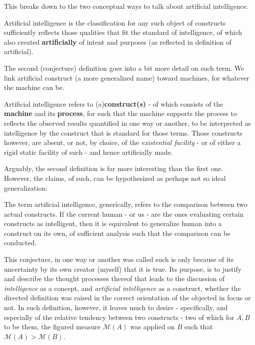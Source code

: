 This breaks down to the two conceptual ways to talk about artificial intelligence.
\begin{conjecture}
    Artificial intelligence is the classification for any such object of constructs sufficiently reflects those qualities that fit the standard of intelligence, of which also created \textbf{artificially} of intent and purposes (as reflected in definition of artificial).
\end{conjecture}

The second (conjecture) definition goes into a bit more detail on such term. We link artificial construct (a more generalized name) toward machines, for whatever the machine can be. 

\begin{conjecture}
    Artificial intelligence refers to (a)\textbf{construct(s)} - of which consists of the \textbf{machine} and its \textbf{process}, for such that the machine supports the process to reflects the observed results quantified in one way or another, to be interpreted as intelligence by the construct that is standard for those terms. Those constructs however, are absent, or not, by choice, of the \textit{existential facility} - or of either a rigid static facility of such - and hence artificially made.
\end{conjecture}

Arguably, the second definition is far more interesting than the first one. However, the claims, of such, can be hypothesized as perhaps not so ideal generalization:

\begin{hypothesis}
    The term artificial intelligence, generically, refers to the comparison between two actual constructs. If the current human - or us - are the ones evaluating certain constructs as intelligent, then it is equivalent to generalize human into a construct on its own, of sufficient analysis such that the comparison can be conducted.
\end{hypothesis}

This conjecture, in one way or another was called such is only because of its uncertainty by its own creator (myself) that it is true. Its purpose, is to justify and describe the thought processes thereof that leads to the discussion of \textit{intelligence} as a concept, and \textit{artificial intelligence} as a construct, whether the directed definition was raised in the correct orientation of the objected in focus or not. In such definition, however, it leaves much to desire - specifically, and especially of the relative tendency between two constructs - two of which for $A,B$ to be them, the figured measure $\mathcal{M}(A)$ was applied on $B$ such that $\mathcal{M}(A)> \mathcal{M}(B)$. 


